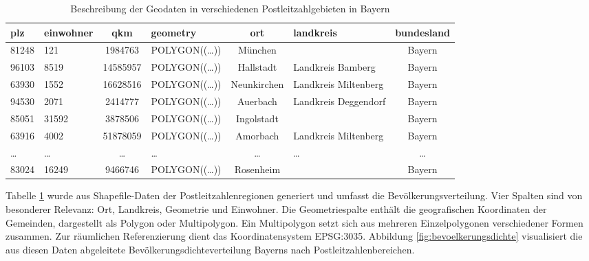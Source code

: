 \begin{table}[htbp]
    \centering
    \small  %
    \caption{Beschreibung der Geodaten in verschiedenen Postleitzahlgebieten in Bayern}
    \label{tab:geodaten}
    \begin{tabularx}{\textwidth}{lXcXcXc}
        \toprule
        \textbf{plz} & \textbf{einwohner} & \textbf{qkm} & \textbf{geometry} & \textbf{ort} & \textbf{landkreis} & \textbf{bundesland} \\
        \midrule
        81248 & 121  & 1984763  & POLYGON((…)) & München & & Bayern \\
        96103 & 8519 & 14585957   & POLYGON((…)) & Hallstadt & Landkreis Bamberg & Bayern \\
        63930 & 1552 & 16628516 & POLYGON((…)) & Neunkirchen & Landkreis Miltenberg & Bayern \\
        94530 & 2071 & 2414777 & POLYGON((…)) & Auerbach & Landkreis Deggendorf & Bayern \\
        85051 & 31592 & 3878506 & POLYGON((…)) & Ingolstadt & & Bayern \\
        63916 & 4002 & 51878059 & POLYGON((…)) & Amorbach & Landkreis Miltenberg & Bayern \\
        \dots & \dots & \dots & \dots & \dots & \dots & \dots \\
        83024 & 16249 & 9466746 & POLYGON((…)) & Rosenheim & & Bayern \\
        \bottomrule
    \end{tabularx}
\end{table}
\clearpage  

Tabelle \ref{tab:geodaten} wurde aus Shapefile-Daten der Postleitzahlenregionen generiert und umfasst die Bevölkerungsverteilung. Vier Spalten sind von besonderer Relevanz: Ort, Landkreis, Geometrie und Einwohner. Die Geometriespalte enthält die geografischen Koordinaten der Gemeinden, dargestellt als Polygon oder Multipolygon. Ein Multipolygon setzt sich aus mehreren Einzelpolygonen verschiedener Formen zusammen. Zur räumlichen Referenzierung dient das Koordinatensystem EPSG:3035. Abbildung \ref{fig:bevoelkerungsdichte} visualisiert die aus diesen Daten abgeleitete Bevölkerungsdichteverteilung Bayerns nach Postleitzahlenbereichen.

